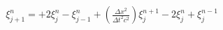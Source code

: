 \documentclass[preview]{standalone}
\begin{document}
\begin{align*}
\xi_{j+1}^{n} =  + 2 \xi_{j}^{n} - \xi_{j-1}^{n} + \left(\frac{\Delta x^2}{\Delta t^2c^2}\right) \xi_{j}^{n+1} - 2 \xi_{j}^{n} + \xi_{j}^{n-1}
\end{align*}
\end{document}
